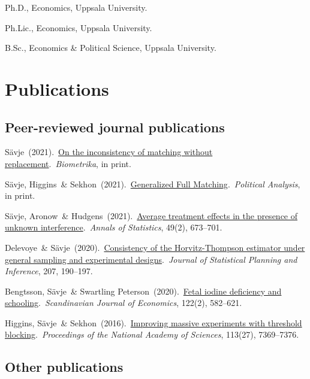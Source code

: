 \documentclass[10pt,letterpaper]{article}
\newenvironment{singledatelist}{
	\begin{list}{}{
		\setlength{\parskip}{0pt}
		\setlength{\itemsep}{4pt}
		\setlength{\parsep}{0.3em}
		\setlength{\leftmargin}{3.5em}
		\setlength{\labelwidth}{3.5em}
		\setlength{\labelsep}{1.5em}
		}
	}{
\end{list}
}
\newcommand{\dateitem}[2][]{\item[{#1}] {#2}}
\newenvironment{infolist}{
	\begin{list}{}{
		\setlength{\parskip}{0pt}
		\setlength{\itemsep}{4pt}
		\setlength{\parsep}{0.3em}
		\setlength{\leftmargin}{0em}
		\setlength{\labelwidth}{0em}
		}
	}{
\end{list}
}
\newcommand{\infoitem}[1]{\item {#1}}
\begin{document}
	\begin{singledatelist}
		\dateitem[2015]{Ph.D., Economics, Uppsala University.}
		\dateitem[2013]{Ph.Lic., Economics, Uppsala University.}
		\dateitem[2010]{B.Sc., Economics \& Political Science, Uppsala University.}
	\end{singledatelist}


	\section*{Publications}

	\subsection*{Peer-reviewed journal publications}

	\begin{infolist}
		\infoitem{Sävje\ (2021).\ \href{https://arxiv.org/abs/1907.07288}{On the inconsistency of matching without replacement}.\ \textit{Biometrika}, in print.}
		\infoitem{Sävje, Higgins\ \& Sekhon\ (2021).\ \href{https://arxiv.org/abs/1703.03882}{Generalized Full Matching}.\ \textit{Political Analysis}, in print.}
		\infoitem{Sävje, Aronow\ \& Hudgens\ (2021).\ \href{https://projecteuclid.org/journals/annals-of-statistics/volume-49/issue-2/Average-treatment-effects-in-the-presence-of-unknown-interference/10.1214/20-AOS1973.short}{Average treatment effects in the presence of unknown interference}.\ \textit{Annals of Statistics}, 49(2), 673--701.}
		\infoitem{Delevoye\ \& Sävje\ (2020).\ \href{https://www.sciencedirect.com/science/article/pii/S0378375819301211}{Consistency of the Horvitz-Thompson estimator under general sampling and experimental designs}.\ \textit{Journal of Statistical Planning and Inference}, 207, 190--197.}
		\infoitem{Bengtsson, Sävje\ \& Swartling Peterson\ (2020).\ \href{https://onlinelibrary.wiley.com/doi/abs/10.1111/sjoe.12341}{Fetal iodine deficiency and schooling}.\ \textit{Scandinavian Journal of Economics}, 122(2), 582--621.}
		\infoitem{Higgins, Sävje\ \& Sekhon\ (2016).\ \href{https://www.pnas.org/content/113/27/7369}{Improving massive experiments with threshold blocking}.\ \textit{Proceedings of the National Academy of Sciences}, 113(27), 7369--7376.}
	\end{infolist}


	\subsection*{Other publications}
\end{document}
